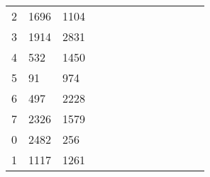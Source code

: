 \begin{table}[tb]
\begin{tabular}{|l|l|l|llllllllll}
		2 & 1696 & 1104 &                           &                          &                          &                          &                           &                          &                           &                           &                           &                           \\ \cline{1-3}
		3 & 1914 & 2831 &                           &                          &                          &                          &                           &                          &                           &                           &                           &                           \\ \cline{1-3}
		4 & 532  & 1450 &                           &                          &                          &                          &                           &                          &                           &                           &                           &                           \\ \cline{1-3}
		5 & 91   & 974  &                           &                          &                          &                          &                           &                          &                           &                           &                           &                           \\ \cline{1-3}
		6 & 497  & 2228 &                           &                          &                          &                          &                           &                          &                           &                           &                           &                           \\ \cline{1-3}
		7 & 2326 & 1579 &                           &                          &                          &                          &                           &                          &                           &                           &                           &                           \\ \cline{1-3}
		0 & 2482 & 256  &                           &                          &                          &                          &                           &                          &                           &                           &                           &                           \\ \cline{1-3}
		1 & 1117 & 1261 &                           &                          &                          &                          &                           &                          &                           &                           &                           &                           \\ \cline{1-3}

\end{tabular}
\end{table}
